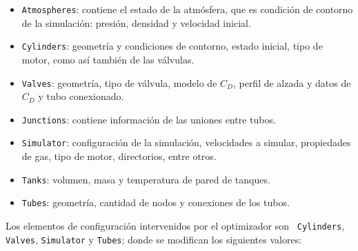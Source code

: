 \begin{itemize}
  \item {\tt Atmospheres}: contiene el estado de la atmósfera, que es condición de
contorno de la simulación: presión, densidad y velocidad inicial.
  \item {\tt Cylinders}: geometría y condiciones de contorno, estado inicial,
tipo de motor, como así también de las válvulas.
  \item {\tt Valves}: geometría, tipo de válvula, modelo de $C_{D}$, perfil de alzada y
datos de $C_{D}$ y tubo conexionado.
  \item {\tt Junctions}: contiene información de las uniones entre tubos.
  \item {\tt Simulator}: configuración de la simulación, velocidades a simular,
propiedades de gas, tipo de motor, directorios, entre otros.
  \item {\tt Tanks}: volumen, masa y temperatura de pared de tanques.
  \item {\tt Tubes}: geometría, cantidad de nodos y conexiones de los tubos.
\end{itemize}

Los elementos de configuración intervenidos por el optimizador son {\tt
Cylinders}, {\tt Valves}, {\tt Simulator} y {\tt Tubes}; donde se  modifican los
siguientes valores:


